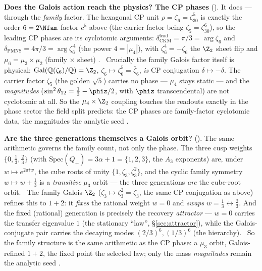 \par\smallskip\noindent\textbf{Does the Galois action reach the physics? The CP phases}
(). It does --- through the \emph{family} factor. The hexagonal CP unit
$\rho=\zeta_6=\zeta_{30}^5$ is exactly the order-$6=2\Nfam$ factor $c^5$ above (the carrier factor being
$\zeta_5=\zeta_{30}^6$), so the leading CP phases are its cyclotomic arguments:
$\delta_{\mathrm{CKM}}^{\mathrm{lead}}=\pi/3=\arg\zeta_6$ and $\delta_{\mathrm{PMNS}}=4\pi/3=\arg\zeta_6^{\,4}$ (the
power $4=|\mu_4|$), with $\zeta_6^4=-\zeta_6$ the $\Z_2$ sheet flip and $\mu_6=\mu_3\times\mu_2$ (family $\times$
sheet) \mC. \mE\ Crucially the family Galois factor itself is physical: $\mathrm{Gal}(\mathbb Q(\zeta_6)/\mathbb Q)
=\Z_2$, $\zeta_6\mapsto\zeta_6^5=\bar\zeta_6$, \emph{is} CP conjugation $\delta\mapsto-\delta$. The carrier factor
$\zeta_5$ (the golden $\sqrt5$) carries no phase --- $\mu_4$ stays static --- and the \emph{magnitudes}
($\sin^2\theta_{12}=\tfrac13-\phiz/2$, with $\phiz$ transcendental) are not cyclotomic at all. So the
$\mu_4\times\Z_2$ coupling touches the readouts exactly in the phase sector the field split predicts: the CP phases
are family-factor cyclotomic data, the magnitudes the analytic seed \mE.

\par\smallskip\noindent\textbf{Are the three generations themselves a Galois orbit?}
(). The same arithmetic governs the family count, not only the phase. The three cusp
weights $\{0,\tfrac13,\tfrac23\}$ (with $\mathrm{Spec}(Q_+)=3\alpha+1=\{1,2,3\}$, the $A_3$ exponents) are, under
$w\mapsto e^{2\pi i w}$, the cube roots of unity $\{1,\zeta_3,\zeta_3^2\}$, and the cyclic family symmetry
$w\mapsto w+\tfrac13$ is a \emph{transitive} $\mu_3$ orbit --- the three generations \emph{are} the cube-root orbit.
\mE\ The family Galois $\Z_2$ ($\zeta_3\mapsto\zeta_3^2=\bar\zeta_3$, the same CP conjugation as above) refines this
to $1{+}2$: it \emph{fixes} the rational weight $w=0$ and \emph{swaps} $w=\tfrac13\leftrightarrow\tfrac23$. And the
fixed (rational) generation is precisely the recovery \emph{attractor} --- $w=0$ carries the transfer eigenvalue $1$
(the stationary ``law'', \S\ref{sec:attractor}), while the Galois-conjugate pair carries the decaying modes
$(2/3)^6,(1/3)^6$ (the hierarchy). \mE\ So the family structure is the same arithmetic as the CP phase: a $\mu_3$
orbit, Galois-refined $1{+}2$, the fixed point the selected law; only the mass \emph{magnitudes} remain the analytic
seed \mC.
